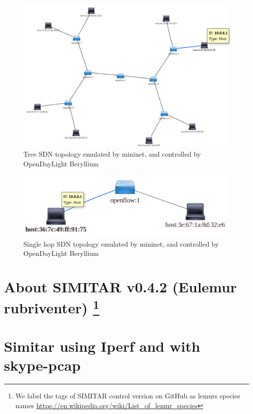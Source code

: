 \begin{figure}[!ht]
	\centering
	\includegraphics[scale=0.4]{figures/ch5/topo-tree}
	\caption{Tree SDN topology emulated by mininet, and controlled by OpenDayLight Beryllium}
	\label{fig:topo-tree}
\end{figure}

\begin{figure}[!ht]
	\centering
	\includegraphics[scale=0.4]{figures/ch5/topo-simple}
	\caption{Single hop SDN topology emulated by mininet, and controlled by OpenDayLight Beryllium}
	\label{fig:topo-simple}
\end{figure}



\section{About SIMITAR v0.4.2 (Eulemur rubriventer) \protect\footnote{We label the tags of SIMITAR control version on GitHub as lemurs species names \href{https://en.wikipedia.org/wiki/List\_of\_lemur\_species}{https://en.wikipedia.org/wiki/List\_of\_lemur\_species}} }


\section{Simitar using Iperf and with skype-pcap}



